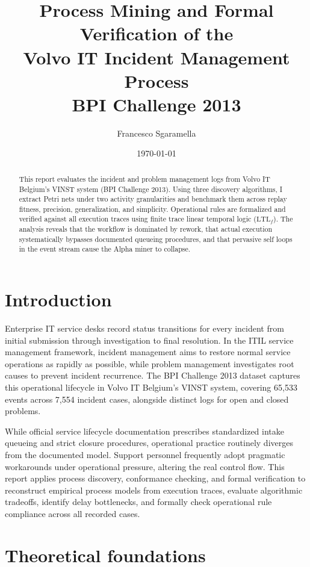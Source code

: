 \documentclass[12pt,a4paper]{article}
\title{Process Mining and Formal Verification of the\\
       Volvo IT Incident Management Process\\
       \large BPI Challenge 2013}
\author{Francesco Sgaramella}
\date{\today}
\begin{document}
\maketitle

\begin{abstract}
This report evaluates the incident and problem management logs from Volvo IT Belgium's VINST system (BPI Challenge 2013). Using three discovery algorithms, I extract Petri nets under two activity granularities and benchmark them across replay fitness, precision, generalization, and simplicity. Operational rules are formalized and verified against all execution traces using finite trace linear temporal logic ($\text{LTL}_f$). The analysis reveals that the workflow is dominated by rework, that actual execution systematically bypasses documented queueing procedures, and that pervasive self loops in the event stream cause the Alpha miner to collapse.
\end{abstract}

\section{Introduction}\label{sec:intro}

Enterprise IT service desks record status transitions for every incident from initial submission through investigation to final resolution. In the ITIL service management framework, incident management aims to restore normal service operations as rapidly as possible, while problem management investigates root causes to prevent incident recurrence. The BPI Challenge 2013 dataset captures this operational lifecycle in Volvo IT Belgium's VINST system, covering 65{,}533 events across 7{,}554 incident cases, alongside distinct logs for open and closed problems.

While official service lifecycle documentation prescribes standardized intake queueing and strict closure procedures, operational practice routinely diverges from the documented model. Support personnel frequently adopt pragmatic workarounds under operational pressure, altering the real control flow. This report applies process discovery, conformance checking, and formal verification to reconstruct empirical process models from execution traces, evaluate algorithmic tradeoffs, identify delay bottlenecks, and formally check operational rule compliance across all recorded cases.

\section{Theoretical foundations}\label{sec:foundations}
\end{document}
